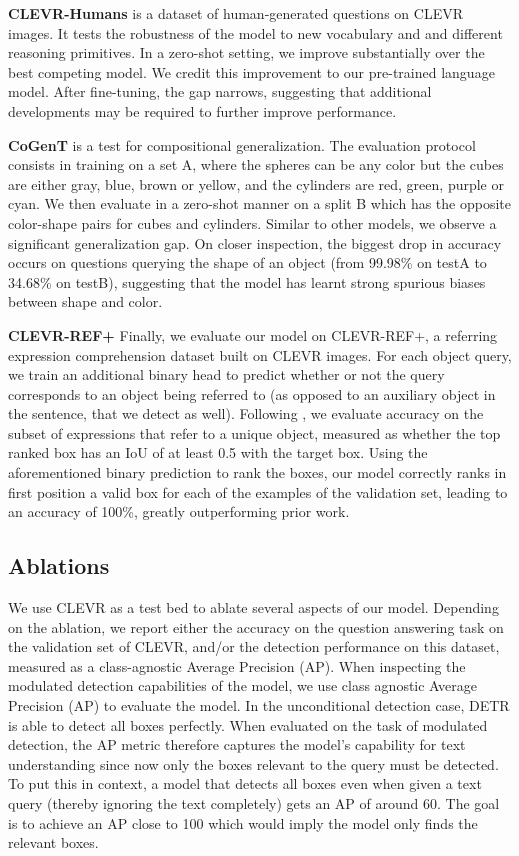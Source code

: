 \textbf{CLEVR-Humans} \cite{johnson_inferring_2017} is a dataset of human-generated questions on CLEVR images. It tests the robustness of the model to new vocabulary and and different reasoning primitives. In a zero-shot setting, we improve substantially over the best competing model. We credit this improvement to our pre-trained language model. After fine-tuning, the gap narrows, suggesting that additional developments may be required to further improve performance. 

\textbf{CoGenT} is a test for compositional generalization. The evaluation protocol consists in training on a set A, where the spheres can be any color but the cubes are either gray, blue, brown or yellow, and the cylinders are red,
green, purple or cyan. We then evaluate in a zero-shot manner on a split B which has the opposite color-shape pairs for cubes and cylinders. Similar to other models, we observe a significant generalization gap. On closer inspection, the biggest drop in accuracy occurs on questions querying the shape of an object (from 99.98\% on testA to 34.68\% on testB), suggesting that the model has learnt strong spurious biases between shape and color. 

\textbf{CLEVR-REF+} Finally, we evaluate our model on CLEVR-REF+\cite{liuCLEVRRefDiagnosingVisual2019}, a referring expression comprehension dataset built on CLEVR images. For each object query, we train an additional binary head to predict whether or not the query corresponds to an object being referred to (as opposed to an auxiliary object in the sentence, that we detect as well). Following \cite{liuCLEVRRefDiagnosingVisual2019}, we evaluate accuracy on the subset of expressions that refer to a unique object, measured as whether the top ranked box has an IoU of at least 0.5 with the target box. Using the aforementioned binary prediction to rank the boxes, our model correctly ranks in first position a valid box for each of the examples of the validation set, leading to an accuracy of 100\%, greatly outperforming prior work.


\subsection{Ablations}
\label{sec:clevr_ablations}
We use CLEVR as a test bed to ablate several aspects of our model. Depending on the ablation, we report either the accuracy on the question answering task on the validation set of CLEVR, and/or the detection performance on this dataset, measured as a class-agnostic Average Precision (AP). When inspecting the modulated detection capabilities of the model, we use class agnostic Average Precision (AP) to evaluate the model. In the unconditional detection case, DETR is able to detect all boxes perfectly. When evaluated on the task of modulated detection, the AP metric therefore captures the model's capability for text understanding since now only the boxes relevant to the query must be detected. 
To put this in context, a model that detects all boxes even when given a text query (thereby ignoring the text completely) gets an AP of around 60. The goal is to achieve an AP close to 100 which would imply the model only finds the relevant boxes. 

